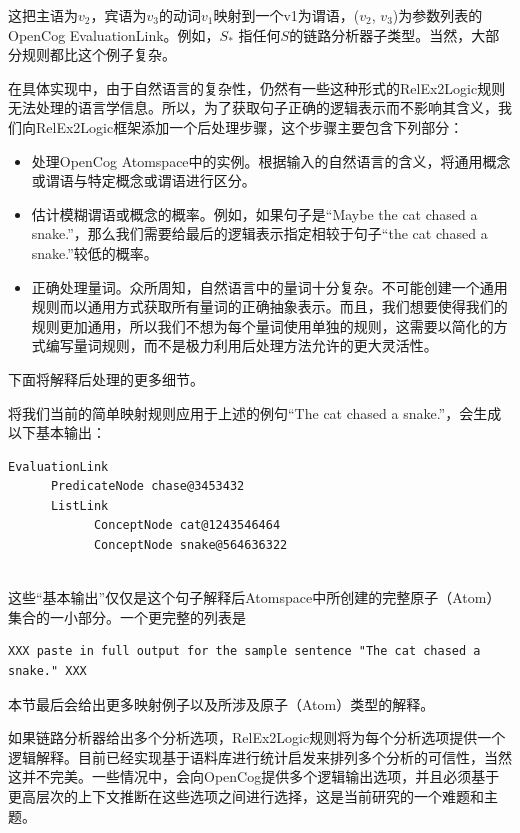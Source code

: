 这把主语为$v_2$，宾语为$v_3$的动词$v_1$映射到一个v1为谓语，($v_2$, $v_3$)为参数列表的OpenCog EvaluationLink。例如，$S_*$ 指任何$S$的链路分析器子类型。当然，大部分规则都比这个例子复杂。

在具体实现中，由于自然语言的复杂性，仍然有一些这种形式的RelEx2Logic规则无法处理的语言学信息。所以，为了获取句子正确的逻辑表示而不影响其含义，我们向RelEx2Logic框架添加一个后处理步骤，这个步骤主要包含下列部分：

\begin{itemize}
\item 处理OpenCog Atomspace中的实例。根据输入的自然语言的含义，将通用概念或谓语与特定概念或谓语进行区分。
\item 估计模糊谓语或概念的概率。例如，如果句子是“Maybe the cat chased a snake.”，那么我们需要给最后的逻辑表示指定相较于句子“the cat chased a snake.”较低的概率。
\item 正确处理量词。众所周知，自然语言中的量词十分复杂。不可能创建一个通用规则而以通用方式获取所有量词的正确抽象表示。而且，我们想要使得我们的规则更加通用，所以我们不想为每个量词使用单独的规则，这需要以简化的方式编写量词规则，而不是极力利用后处理方法允许的更大灵活性。
\end{itemize}

下面将解释后处理的更多细节。

将我们当前的简单映射规则应用于上述的例句“The cat chased a snake.”，会生成以下基本输出：

 {\tt\begin{small}\begin{lstlisting}
EvaluationLink 
      PredicateNode chase@3453432
      ListLink
            ConceptNode cat@1243546464
            ConceptNode snake@564636322
       
\end{lstlisting}\end{small}}

这些“基本输出”仅仅是这个句子解释后Atomspace中所创建的完整原子（Atom）集合的一小部分。一个更完整的列表是

{\tt\begin{small}\begin{lstlisting}
XXX paste in full output for the sample sentence "The cat chased a snake." XXX
\end{lstlisting}\end{small}}

本节最后会给出更多映射例子以及所涉及原子（Atom）类型的解释。

如果链路分析器给出多个分析选项，RelEx2Logic规则将为每个分析选项提供一个逻辑解释。目前已经实现基于语料库进行统计启发来排列多个分析的可信性，当然这并不完美。一些情况中，会向OpenCog提供多个逻辑输出选项，并且必须基于更高层次的上下文推断在这些选项之间进行选择，这是当前研究的一个难题和主题。



